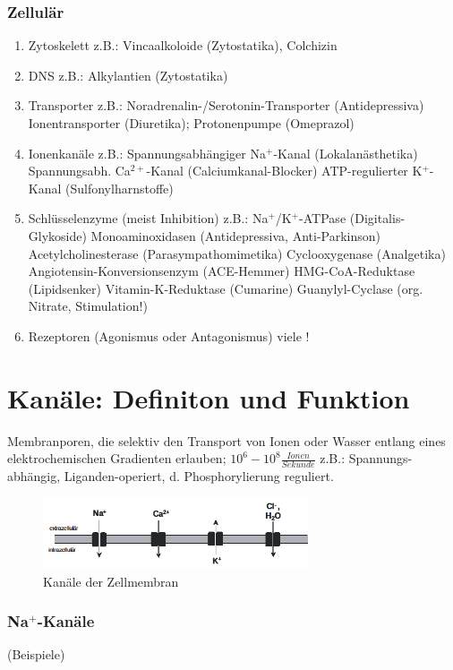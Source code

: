 \documentclass[10pt,a4paper]{report}
\begin{document}
\subsubsection{Zellulär}

\begin{enumerate}
	\item Zytoskelett z.B.: Vincaalkoloide (Zytostatika), Colchizin 
	\item DNS z.B.: Alkylantien (Zytostatika)
	\item Transporter z.B.: Noradrenalin-/Serotonin-Transporter (Antidepressiva) Ionentransporter (Diuretika); Protonenpumpe (Omeprazol)
	\item Ionenkanäle z.B.: 
	Spannungsabhängiger Na$^+$-Kanal (Lokalanästhetika)
	Spannungsabh. Ca$^{2+}$-Kanal (Calciumkanal-Blocker)
	ATP-regulierter K$^+$-Kanal (Sulfonylharnstoffe)
	\item Schlüsselenzyme (meist Inhibition) z.B.:
		Na$^+$/K$^+$-ATPase (Digitalis-Glykoside)
		Monoaminoxidasen (Antidepressiva, Anti-Parkinson)
		Acetylcholinesterase (Parasympathomimetika)		
		Cyclooxygenase (Analgetika)
		Angiotensin-Konversionsenzym (ACE-Hemmer)
		HMG-CoA-Reduktase (Lipidsenker)
		Vitamin-K-Reduktase (Cumarine)
		Guanylyl-Cyclase (org. Nitrate, Stimulation!)
	\item Rezeptoren (Agonismus oder Antagonismus)	viele !
\end{enumerate}

\section{Kanäle: Definiton und Funktion}
Membranporen, die selektiv den Transport von Ionen oder Wasser entlang eines elektrochemischen Gradienten erlauben; $10^6-10^8\frac{Ionen}{Sekunde}$ z.B.: Spannungs-abhängig, Liganden-operiert, d. Phosphorylierung reguliert.

\begin{figure}[h]
	\centering 
	\includegraphics[width=0.7\textwidth]{Bilder/kanaele.png} 
	\caption{Kanäle der Zellmembran} 
	\label{fig:Kanaele}
\end{figure}

\subsubsection{Na$^+$-Kanäle} (Beispiele)\\
\end{document}
